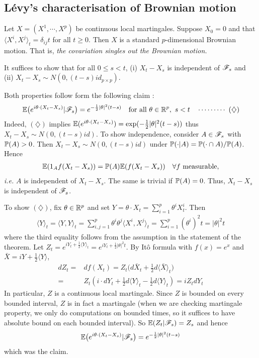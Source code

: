 \documentclass[12pt,a4paper]{article}
\newenvironment{proof}
{\begin{changemargin}{0.5cm}{0.5cm} 
	}%
	{\end{changemargin}
}
\newenvironment{p}
{\begin{proof} 
	}%
	{\end{proof}
}
\begin{document}
\subsection{L\'evy's characterisation of Brownian motion}

\thm Let $X = (X^1, \cdots, X^p)$ be continuous local martingales. Suppose $X_0 = 0$ and that $\langle X^i, X^j \rangle_t = \delta_{ij} t$ for all $t\geq 0$. Then $X$ is a standard $p$-dimensional Brownian motion. That is, \emph{the covariation singles out the Brownian motion.}
\begin{p}
\pf It suffices to show that for all $0\leq s <t$, (i) $X_t - X_s$ is independent of $\mathscr{F}_s$ and (ii) $X_t - X_s \sim N(0, (t-s)id_{p \times p})$.

\quad Both properties follow form the following claim :
\begin{align*}
\mathbb{E} \big(e^{i\theta \cdot (X_t - X_s)} | \mathscr{F}_s \big) = e^{-\frac{1}{2} |\theta|^2 (t-s)} \quad \text{for all } \theta\in \mathbb{R}^p, \,\, s< t \quad \cdots\cdots\cdots\,\,(\diamondsuit)
\end{align*}
Indeed, $(\diamondsuit)$ implies $\mathbb{E} (e^{i\theta \cdot (X_t - X_s)}) = \exp (- \frac{1}{2} |\theta|^2 (t-s))$ thus $X_t - X_s \sim N(0, (t-s)id)$. To show independence, consider $A\in \mathscr{F}_s$ with $\mathbb{P} (A) > 0$. Then $X_t - X_s \sim N (0, (t-s)id)$ under $\mathbb{P} (\cdot |A) = \mathbb{P}(\cdot \cap A) / \mathbb{P}(A)$. Hence
\begin{align*}
\mathbb{E} (1_A f(X_t - X_s)) = \mathbb{P}(A) \mathbb{E}(f(X_t - X_s))\quad \forall f \text{ measurable},
\end{align*}
\textit{i.e.} $A$ is independent of $X_t - X_s$. The same is trivial if $\mathbb{P}(A) =0$. Thus, $X_t - X_s$ is independent of $\mathscr{F}_s$.
\s

To show $(\diamondsuit)$, fix $\theta \in \mathbb{R}^p$ and set $Y = \theta \cdot X_t = \sum_{i=1}^p \theta^i X_t^i$. Then
\begin{align*}
\langle Y \rangle_t = \langle Y , Y \rangle_t = \sum_{i,j=1}^p \theta^i \theta^j \langle X^i, X^j \rangle_t = \sum_{i=1}^p (\theta^i)^2 t = |\theta|^2 t
\end{align*}
where the third equality follows from the assumption in the statement of the theorem. Let $Z_t = e^{i Y_t + \frac{1}{2} \langle Y \rangle_t} = e^{iY_t + \frac{1}{2} |\theta|^2 t}$. By It\^o formula with $f(x) = e^x$ and $\bar{X}= iY + \frac{1}{2} \langle Y \rangle$,
\begin{align*}
dZ_t =& df(X_t) = Z_t \big( d\bar{X}_t + \frac{1}{2} d\langle \bar{X} \rangle_t \big) \\
=& Z_t (i \cdot dY_t + \frac{1}{2} d\langle Y \rangle_t - \frac{1}{2} d\langle Y \rangle_t) = iZ_t dY_t
\end{align*}
In particular, $Z$ is a continuous local martingale. Since $Z$ is bounded on every bounded interval, $Z$ is in fact a martingale (when we are checking martingale property, we only do computations on bounded times, so it suffices to have absolute bound on each bounded interval). So $\mathbb{E}(Z_t | \mathscr{F}_s) = Z_s$ and hence
\begin{align*}
\mathbb{E} \big( e^{i\theta \cdot (X_t - X_s)} | \mathscr{F}_s \big) = e^{-\frac{1}{2} |\theta|^2 (t-s)}
\end{align*}
which was the claim.


\end{p}
\end{document}
